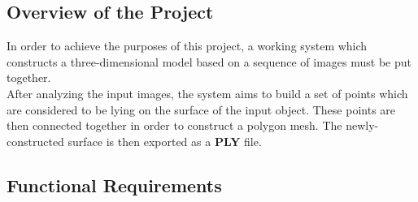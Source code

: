 \documentclass[12pt,a4paper,twoside,openright]{report}
\begin{document}
\subsection{Overview of the Project}
In order to achieve the purposes of this project, a working system which constructs a three-dimensional model based on a sequence of images must be put together. \\
After analyzing the input images, the system aims to build a set of points which are considered to be lying on the surface of the input object. These points are then connected together in order to construct a polygon mesh. The newly-constructed surface is then exported as a \textbf{PLY} file.\\
\subsection{Functional Requirements}
\end{document}
